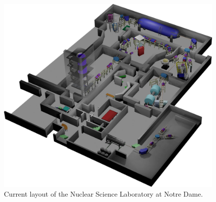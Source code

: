 \begin{figure}
    \centering
    \includegraphics[scale=0.25]{Setup_Figs/NSL_2018_Layout.png}
    \caption{Current layout of the Nuclear Science Laboratory at Notre Dame.}
    \label{fig:NSL}
\end{figure}